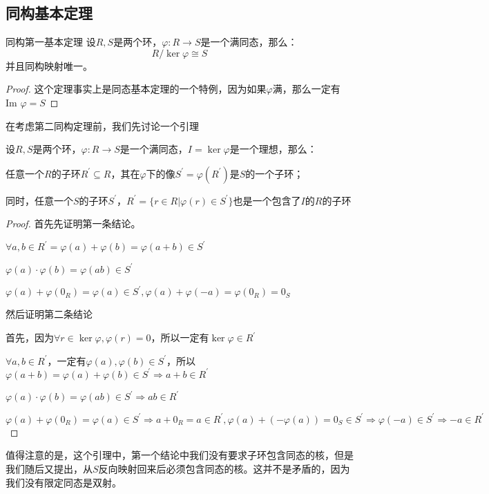 \documentclass[12pt, a4paper, oneside, UTF8]{ctexbook}
\begin{document}
		\subsection{同构基本定理}
			\begin{them}{同构第一基本定理}{}
				设$R,S$是两个环，$\varphi : R \rightarrow S$是一个满同态，那么：
				\begin{equation}
					R / \ker \varphi \cong S
				\end{equation}
				并且同构映射唯一。
			\end{them}
			\begin{proof}
				这个定理事实上是同态基本定理的一个特例，因为如果$\varphi $满，那么一定有$\text{Im }\varphi = S$
			\end{proof}
			在考虑第二同构定理前，我们先讨论一个引理
			\begin{lemma}{}{}
				设$R,S$是两个环，$\varphi : R \rightarrow S$是一个满同态，$I=\ker \varphi$是一个理想，那么：

				任意一个$R$的子环$R^{\prime} \subseteq R$，其在$\varphi $下的像$S^{\prime}=\varphi (R^{\prime})$是$S$的一个子环；

				同时，任意一个$S$的子环$S^{\prime}$，$R^{\prime}=\{r \in R| \varphi (r) \in S^{\prime}\}$也是一个包含了$I$的$R$的子环
			\end{lemma}
			\begin{proof}
				首先先证明第一条结论。

				$\forall a,b \in R^{\prime}=\varphi (a)+\varphi (b)=\varphi (a+b)\in S^{\prime}$

				$\varphi (a)\cdot \varphi (b)=\varphi (ab) \in S^{\prime}$

				$\varphi (a) + \varphi (0_R) = \varphi (a) \in S^{\prime},\varphi (a)+\varphi (-a)=\varphi (0_R)=0_S$

				然后证明第二条结论

				首先，因为$\forall r \in \ker \varphi ,\varphi (r) = 0$，所以一定有$\ker \varphi \in R^{\prime}$

				$\forall a,b \in R^{\prime}$，一定有$\varphi (a),\varphi (b) \in S^{\prime}$，所以$\varphi (a+b)=\varphi (a)+\varphi (b) \in S^{\prime} \Rightarrow a+b \in R^{\prime}$

				$\varphi (a)\cdot \varphi (b)=\varphi (ab) \in S^{\prime} \Rightarrow ab \in R^{\prime}$

				$\varphi (a) + \varphi (0_R) = \varphi (a) \in S^{\prime} \Rightarrow a+0_R=a \in R^{\prime},\varphi (a)+\left(-\varphi (a)\right)=0_S \in S^{\prime}\Rightarrow \varphi (-a) \in S^{\prime} \Rightarrow -a \in R^{\prime}$
			\end{proof}
			值得注意的是，这个引理中，第一个结论中我们没有要求子环包含同态的核，但是我们随后又提出，从$S$反向映射回来后必须包含同态的核。这并不是矛盾的，因为我们没有限定同态是双射。
\end{document}
